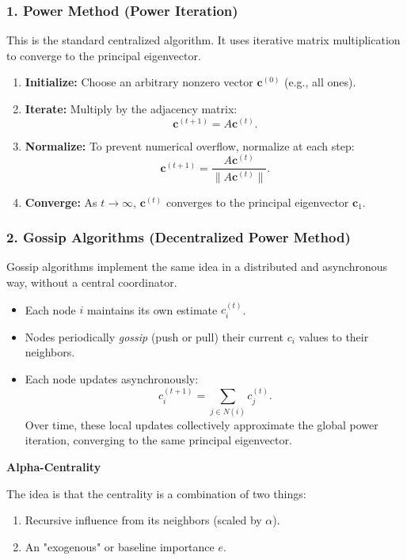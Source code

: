 \subsubsection*{1. Power Method (Power Iteration)}
This is the standard centralized algorithm. It uses iterative matrix multiplication to converge to the principal eigenvector.

\begin{enumerate}
    \item \textbf{Initialize:} Choose an arbitrary nonzero vector $\mathbf{c}^{(0)}$ (e.g., all ones).
    \item \textbf{Iterate:} Multiply by the adjacency matrix:
    \[
    \mathbf{c}^{(t+1)} = A \mathbf{c}^{(t)}.
    \]
    \item \textbf{Normalize:} To prevent numerical overflow, normalize at each step:
    \[
    \mathbf{c}^{(t+1)} = \frac{A \mathbf{c}^{(t)}}{\|A \mathbf{c}^{(t)}\|}.
    \]
    \item \textbf{Converge:} As $t \to \infty$, $\mathbf{c}^{(t)}$ converges to the principal eigenvector $\mathbf{c}_1$.  

\end{enumerate}

\subsubsection*{2. Gossip Algorithms (Decentralized Power Method)}
Gossip algorithms implement the same idea in a distributed and asynchronous way, without a central coordinator.

\begin{itemize}
    \item Each node $i$ maintains its own estimate $c_i^{(t)}$.
    \item Nodes periodically \emph{gossip} (push or pull) their current $c_i$ values to their neighbors.
    \item Each node updates asynchronously:
    \[
    c_i^{(t+1)} = \sum_{j \in N(i)} c_j^{(t)}.
    \]
    Over time, these local updates collectively approximate the global power iteration, converging to the same principal eigenvector.
\end{itemize}

\textbf{Alpha-Centrality}

The idea is that the centrality is a combination of two things:

\begin{enumerate}
    \item Recursive influence from its neighbors (scaled by $\alpha$).
    \item An "exogenous" or baseline importance $e$.
\end{enumerate}



